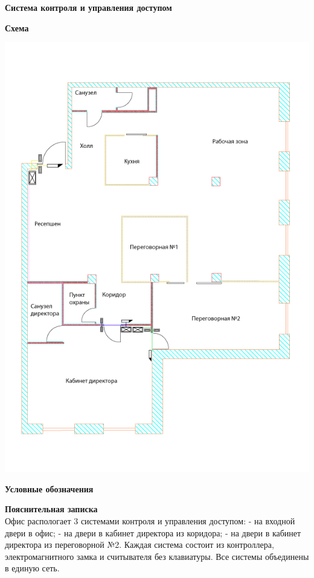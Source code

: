 \documentclass[a4paper,14pt]{extarticle}
\begin{document}
    \newpage
    \textbf{\large{Система контроля и управления доступом}}

    \begin{center}
        \textbf{Схема}
    \end{center}
    \vspace{-6ex}
    \begin{center}
        \includegraphics[scale=0.65, angle=90]{pics/SCUD.png}
    \end{center}
    \textbf{Условные обозначения}
    \begin{center}
        
    \end{center}
    \textbf{Пояснительная записка}\\
    Офис распологает 3 системами контроля и управления доступом:
    - на входной двери в офис;
    - на двери в кабинет директора из коридора;
    - на двери в кабинет директора из переговорной №2.
    Каждая система состоит из контроллера, электромагнитного замка и считывателя без клавиатуры. 
    Все системы объединены в единую сеть.



 
    


    
    
\end{document}
